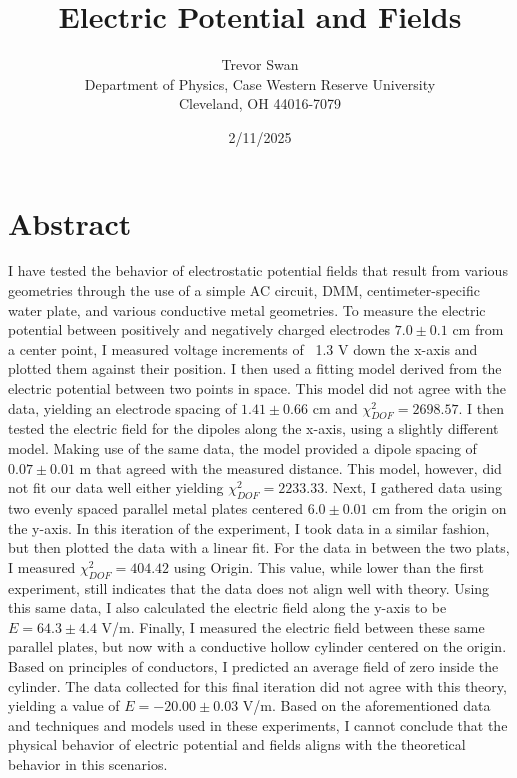 \documentclass[12pt]{article}
\title{Electric Potential and Fields}
\author{Trevor Swan \\
Department of Physics, Case Western Reserve University \\
Cleveland, OH 44016-7079}
\date{2/11/2025}
\begin{document}
\pagestyle{fancy}
\fancyhf{}

\maketitle
\thispagestyle{fancy}
\renewcommand{\headrulewidth}{0pt}

\fancyfoot[C]{\thepage}

\section{Abstract}
I have tested the behavior of electrostatic potential fields that result from various geometries through the use of a simple AC circuit, DMM, centimeter-specific water plate, and various conductive metal geometries. To measure the electric potential between positively and negatively charged electrodes $7.0\pm0.1$ cm from a center point, I measured voltage increments of ~1.3 V down the x-axis and plotted them against their position. I then used a fitting model derived from the electric potential between two points in space. This model did not agree with the data, yielding an electrode spacing of $1.41\pm0.66$ cm and $\chi^2_{DOF}=2698.57$. I then tested the electric field for the dipoles along the x-axis, using a slightly different model. Making use of the same data, the model provided a dipole spacing of $0.07\pm0.01$ m that agreed with the measured distance. This model, however, did not fit our data well either yielding $\chi^2_{DOF}=2233.33$. Next, I gathered data using two evenly spaced parallel metal plates centered $6.0\pm0.01$ cm from the origin on the y-axis. In this iteration of the experiment, I took data in a similar fashion, but then plotted the data with a linear fit. For the data in between the two plats, I measured $\chi^2_{DOF}=404.42$ using Origin. This value, while lower than the first experiment, still indicates that the data does not align well with theory. Using this same data, I also calculated the electric field along the y-axis to be $E=64.3\pm4.4$ V/m. Finally, I measured the electric field between these same parallel plates, but now with a conductive hollow cylinder centered on the origin. Based on principles of conductors, I predicted an average field of zero inside the cylinder. The data collected for this final iteration did not agree with this theory, yielding a value of $E=-20.00\pm0.03$ V/m. Based on the aforementioned data and techniques and models used in these experiments, I cannot conclude that the physical behavior of electric potential and fields aligns with the theoretical behavior in this scenarios.
\end{document}
